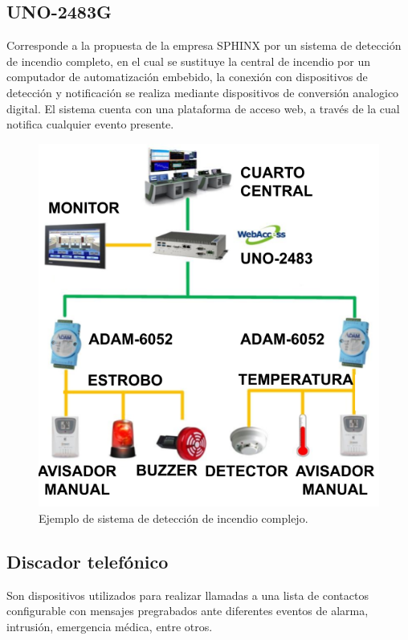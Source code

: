 \subsection{UNO-2483G}

Corresponde a la propuesta de la empresa SPHINX por un sistema de detección de incendio completo, en el cual se sustituye la central de incendio por un computador de automatización embebido, la conexión con dispositivos de detección y notificación se realiza mediante dispositivos de conversión analogico digital. El sistema cuenta con una plataforma de acceso web, a través de la cual notifica cualquier evento presente.  
	
	\begin{figure}[h]
	\centering
	\includegraphics[scale=.4]{./Figures/Capitulo1/FIG_F1.png}
	\caption{Ejemplo de sistema de detección de incendio complejo.}
	\label{fig:figura_f1}
\end{figure}

\subsection{Discador telefónico}

Son dispositivos utilizados para realizar llamadas a una lista de contactos configurable con mensajes pregrabados ante diferentes eventos de alarma, intrusión, emergencia médica, entre otros. 

